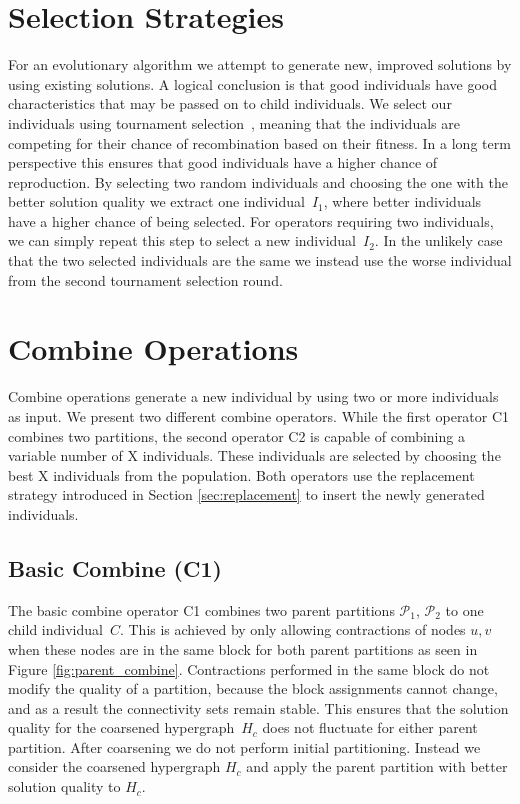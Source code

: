 \documentclass[a4paper,12pt,titlepage, BCOR7mm,headsepline]{scrbook}
\numberwithin{equation}{section}
\begin{document}
\section{Selection Strategies}
\label{sec:selectionstrategies}
For an evolutionary algorithm we attempt to generate new, improved solutions by using existing solutions. A logical conclusion is that good individuals have good characteristics that may be passed on to child individuals.
We select our individuals using tournament selection~\cite{blickle1996comparison}, meaning that the individuals are competing for their chance of recombination based on their fitness. In a long term perspective this ensures that good individuals have a higher chance of reproduction. By selecting two random individuals and choosing the one with the better solution quality we extract one individual~$I_1$, where better individuals have a higher chance of being selected. For operators requiring two individuals, we can simply repeat this step to select a new individual~$I_2$. In the unlikely case that the two selected individuals are the same we instead use the worse individual from the second tournament selection round.
\section{Combine Operations}
\label{sec:combines}
Combine operations generate a new individual by using two or more individuals as input. We present two different combine operators. While the first operator C1 combines two partitions, the second operator C2 is capable of combining a variable number of X individuals. These individuals are selected by choosing the best X individuals from the population. Both operators use the replacement strategy introduced in Section \ref{sec:replacement} to insert the newly generated individuals.
\subsection{Basic Combine (C1)}
\label{sec:basiccombine}
The basic combine operator C1 combines two parent partitions $\mathcal{P}_1$, $\mathcal{P}_2$ to one child individual~$C$. This is achieved by only allowing contractions of nodes $u, v$ when these nodes are in the same block for both parent partitions as seen in Figure \ref{fig:parent_combine}. Contractions performed in the same block do not modify the quality of a partition, because the block assignments cannot change, and as a result the connectivity sets remain stable.
This ensures that the solution quality for the coarsened hypergraph~$H_c$ does not fluctuate for either parent partition.  
After coarsening we do not perform initial partitioning. Instead we consider the coarsened hypergraph $H_c$ and apply the parent partition with better solution quality to $H_c$.
\end{document}

